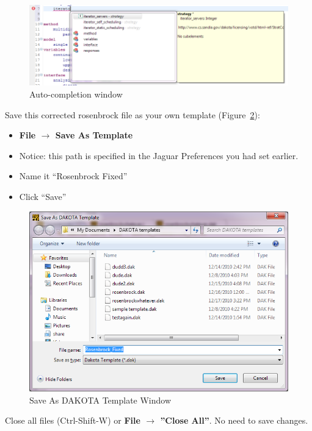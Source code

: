 \begin{figure}[htbp]
  \centering
  \includegraphics[scale=0.6]{images/8iterato}
  \caption{Auto-completion window}
  \label{fig:input:8iterato}
\end{figure}


Save this corrected rosenbrock file as your own template (Figure~\ref{fig:input:9SaveAsTemplate}):
\begin{itemize}
\item {\bf File $\rightarrow$ Save As Template}
\item Notice: this path is specified in the Jaguar Preferences you had set earlier.
\item Name it ``Rosenbrock Fixed''
\item Click ``Save''
\end{itemize} 
\begin{figure}[htbp]
  \centering
  \includegraphics[scale=0.6]{images/9SaveAsTemplate}
  \caption{Save As DAKOTA Template Window}
  \label{fig:input:9SaveAsTemplate}
\end{figure}


Close all files (Ctrl-Shift-W) or {\bf File $\rightarrow$ ''Close All''}. No need to save changes.


